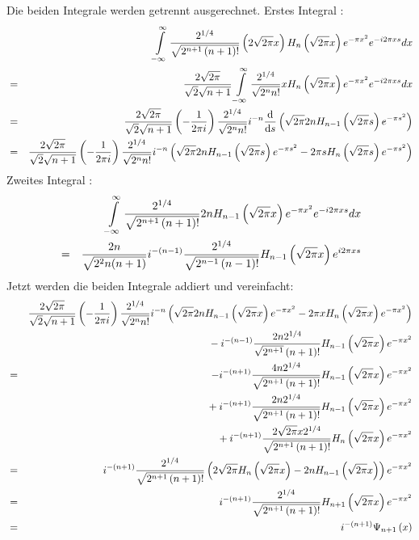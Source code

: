 \documentclass[11pt,twoside]{report}
\begin{document}
\vfill
Die beiden Integrale werden getrennt ausgerechnet. 
\vfill
Erstes Integral : 
\begin{eqnarray*}
  && \int\limits_{-\infty}^{\infty} \frac{2^{1/4}}{\sqrt{2^{n+1} \left( n+1 \right) ! }} \left( 2\sqrt{2\pi}x \right) H_n \left( \sqrt{2\pi}x \right) e^{ -\pi x^2 } e^{ -i2\pi xs } dx \\ & = & 
  \frac{2 \sqrt{2\pi}}{\sqrt{2}\sqrt{n+1}} \int\limits_{-\infty}^{\infty} \frac{2^{1/4}}{\sqrt{2^n n!}} x H_n \left( \sqrt{2\pi}x \right) e^{ -\pi x^2 } e^{ -i2\pi xs } dx \\ & = & 
  \frac{2 \sqrt{2\pi}}{\sqrt{2}\sqrt{n+1}} \left( -\frac{1}{2\pi i} \right) \frac{2^{1/4}}{\sqrt{2^n n!}} i^{-n} {\mbox{d} \over \mbox{d} s} \left( \sqrt{2\pi} 2n H_{n-1} \left( \sqrt{2\pi}s \right) e^{ -\pi s^2 } \right) \\ & = &
  \frac{2 \sqrt{2\pi}}{\sqrt{2}\sqrt{n+1}} \left( -\frac{1}{2\pi i} \right) \frac{2^{1/4}}{\sqrt{2^n n!}} i^{-n}\left( \sqrt{2\pi}2n H_{n-1} \left( \sqrt{2\pi}s \right) e^{ -\pi s^2 } - 2\pi s H_n \left( \sqrt{2\pi}s \right) e^{ -\pi s^2 } \right) 
\end{eqnarray*}
\vfill
Zweites Integral : 
\begin{eqnarray*}
  &&\int\limits_{-\infty}^{\infty} \frac{2^{1/4}}{\sqrt{2^{n+1}\left( n+1 \right) !}} 2n H_{n-1} \left( \sqrt{2\pi}x \right) e^{ -\pi x^2 } e^{ -i2\pi xs } dx \\ & = &
  \frac{2n}{\sqrt{2^2 n (n+1)}} i^{-\left( n-1 \right)} \frac{2^{1/4}}{\sqrt{2^{n-1}\left( n-1 \right) !}} H_{n-1} \left( \sqrt{2\pi}x \right) e^{ i2\pi xs } \\ 
\end{eqnarray*}
\newpage
Jetzt werden die beiden Integrale addiert und vereinfacht:
\begin{eqnarray*}
  && \frac{2\sqrt{2\pi}}{\sqrt{2}\sqrt{n+1}} \left( -\frac{1}{2\pi i} \right) \frac{2^{1/4}}{\sqrt{2^n n!}} i^{-n} \left( \sqrt{2\pi} 2n H_{n-1} \left( \sqrt{2\pi}x  \right) e^{ -\pi x^2 } - 2\pi x H_n\left( \sqrt{2\pi}x \right) e^{ -\pi x^2 } \right) \\ &&{} - i^{-\left( n-1 \right)}\frac{2n 2^{1/4}}{\sqrt{2^{n+1}} \left( n+1 \right) !} H_{n-1} \left( \sqrt{2\pi}x \right) e^{ -\pi x^2 } \\ & = &
  -i^{-\left( n+1\right) } \frac{4n 2^{1/4}}{\sqrt{2^{n+1}\left( n+1 \right) !}} H_{n-1} \left( \sqrt{2\pi}x \right) e^{ -\pi x^2 } \\ &&{} + i^{-\left( n+1 \right)} \frac{2n2^{1/4}}{\sqrt{2^{n+1}\left( n+1 \right) !}} H_{n-1} \left( \sqrt{2\pi}x \right) e^{ -\pi x^2 } \\ &&{} + i^{-\left( n+1 \right)} \frac{2\sqrt{2\pi}x 2^{1/4}}{\sqrt{2^{n+1}\left( n+1 \right) !}} H_n \left( \sqrt{2\pi}x \right) e^{ -\pi x^2 } \\ & = &
  i^{-\left( n+1 \right)} \frac{2^{1/4}}{\sqrt{2^{n+1}\left( n+1 \right) !}} \left( 2\sqrt{2\pi} H_n\left( \sqrt{2\pi}x \right) - 2n H_{n-1} \left( \sqrt{2\pi}x \right) \right) e^{ -\pi x^2 } \\ & = &
   i^{- \left( n+1 \right)} \frac{2^{1/4}}{\sqrt{2^{n+1}\left( n+1 \right) !}} H_{n+1} \left( \sqrt{2\pi}x \right) e^{ -\pi x^2 } \\ & = &
  i^{- \left( n+1 \right)} \Psi_{n+1} \left(x \right)
\end{eqnarray*}
\end{document}
